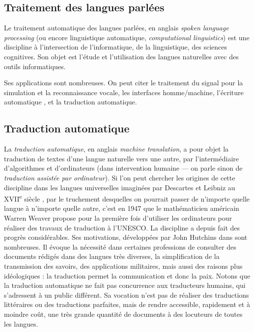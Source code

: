 \documentclass[a4paper,10pt]{article}
\begin{document}
\subsection{Traitement des langues parlées}

Le traitement automatique des langues parlées, en anglais \emph{spoken language processing} (ou encore linguistique automatique, \emph{computational linguistics}) est une discipline à l'intersection de l'informatique, de la linguistique, des sciences cognitives. Son objet est l'étude et l'utilisation des langues naturelles avec des outils informatiques.

Ses applications sont nombreuses. On peut citer le traitement du signal pour la simulation et la reconnaissance vocale, les interfaces homme/machine, l'écriture automatique %
, et la traduction automatique.

\subsection{Traduction automatique}

La \emph{traduction automatique}, en anglais \emph{machine translation}, a pour objet la traduction de textes d'une langue naturelle vers une autre, par l'intermédiaire d'algorithmes et d'ordinateurs (dans intervention humaine --- on parle sinon de \emph{traduction assistée par ordinateur}). Si l'on peut chercher les origines de cette discipline dans les langues universelles imaginées par Descartes et Leibniz au XVII\textsuperscript{e} siècle
, par le truchement desquelles on pourrait passer de n'importe quelle langue à n'importe quelle autre, c'est en 1947 que le mathématicien américain Warren Weaver propose pour la première fois d'utiliser les ordinateurs pour réaliser des travaux de traduction à l'UNESCO.
La discipline a depuis fait des progrès considérables. Ses motivations, développées par John Hutchins dans
sont nombreuses. Il évoque la nécessité dans certaines professions de consulter des documents rédigés dans des langues très diverses, la simplification de la transmission des savoirs, des applications militaires, mais aussi des raisons plus idéologiques : la traduction permet la communication et donc la paix. Notons que la traduction automatique ne fait pas concurrence aux traducteurs humains, qui s'adressent à un public différent. Sa vocation n'est pas de réaliser des traductions littéraires ou des traductions parfaites, mais de rendre accessible, rapidement et à moindre coût, une très grande quantité de documents à des locuteurs de toutes les langues.
\end{document}

